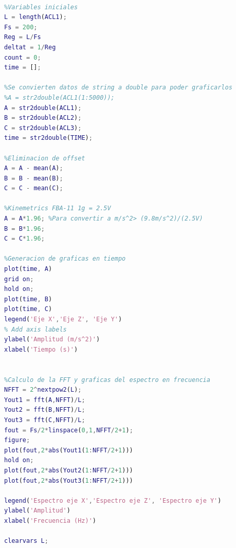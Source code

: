 
\begin{lstlisting}[language=matlab, caption=Programa de procesamiento de datos provenientes de tarjeta PCI-6221]

%Variables iniciales
L = length(ACL1);
Fs = 200;
Reg = L/Fs
deltat = 1/Reg
count = 0;
time = [];

%Se convierten datos de string a double para poder graficarlos
%A = str2double(ACL1(1:5000));
A = str2double(ACL1);
B = str2double(ACL2);
C = str2double(ACL3);
time = str2double(TIME);

%Eliminacion de offset
A = A - mean(A);
B = B - mean(B);
C = C - mean(C);

%Kinemetrics FBA-11 1g = 2.5V
A = A*1.96; %Para convertir a m/s^2> (9.8m/s^2)/(2.5V)
B = B*1.96;
C = C*1.96;

%Generacion de graficas en tiempo
plot(time, A)
grid on;
hold on;
plot(time, B)
plot(time, C)
legend('Eje X','Eje Z', 'Eje Y')
% Add axis labels
ylabel('Amplitud (m/s^2)')
xlabel('Tiempo (s)')


%Calculo de la FFT y graficas del espectro en frecuencia
NFFT = 2^nextpow2(L);
Yout1 = fft(A,NFFT)/L;
Yout2 = fft(B,NFFT)/L;
Yout3 = fft(C,NFFT)/L;
fout = Fs/2*linspace(0,1,NFFT/2+1);
figure;
plot(fout,2*abs(Yout1(1:NFFT/2+1)))
hold on;
plot(fout,2*abs(Yout2(1:NFFT/2+1)))
plot(fout,2*abs(Yout3(1:NFFT/2+1)))

legend('Espectro eje X','Espectro eje Z', 'Espectro eje Y')
ylabel('Amplitud')
xlabel('Frecuencia (Hz)')

clearvars L;

\end{lstlisting}

